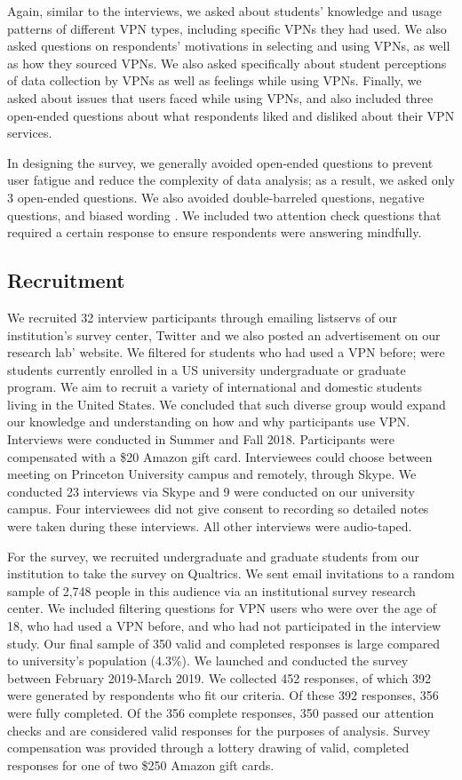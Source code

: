 Again, similar to the interviews, we asked about students’
knowledge and usage patterns of different VPN types, including specific VPNs
they had used. We also asked questions on respondents’ motivations in
selecting and using VPNs, as well as how they sourced VPNs. We also asked specifically 
about student perceptions of data collection by VPNs as well as feelings while
using VPNs. Finally, we asked about issues that
users faced while using VPNs, and also included three open-ended questions about
what respondents liked and disliked about their VPN services.

In designing the survey, we generally avoided open-ended questions to prevent
user fatigue and reduce the complexity of data analysis; as a result, we asked
only 3 open-ended questions. We also avoided double-barreled questions,
negative questions, and biased wording \cite{lazar_28}. We included two attention check
questions that required a certain response to ensure respondents were answering mindfully. 

\subsection{Recruitment} We recruited 32 interview participants through
emailing listservs of our institution's survey center, Twitter and we also
posted an advertisement on  our research lab' website. We filtered for students who had used a VPN before; were students currently enrolled in a US university undergraduate or graduate program.  We aim to recruit a variety of international and domestic students living in the United States.
We concluded that such diverse group would expand our knowledge and
understanding on how and why participants use VPN. Interviews were conducted in Summer and Fall 2018. Participants were compensated with a \$20 Amazon gift card.  Interviewees
could choose between meeting on Princeton University campus and remotely,
through Skype. We conducted 23 interviews via Skype and 9 were conducted on our university campus.  Four interviewees did not give consent to
recording so detailed notes were taken during these interviews. All other interviews were audio-taped.

For the survey, we recruited undergraduate and
graduate students from our institution to take the survey on Qualtrics. We sent email invitations to a random sample of 2,748 people in this
audience via an institutional survey research center. We included filtering questions for VPN users who were
over the age of 18, who had used a VPN before, and who had not participated in the interview study. Our
final sample of 350 valid and completed responses is large compared to
university's population (4.3\%). We launched and conducted the survey between February 2019-March 2019. We collected 452 responses, of which 392 were generated by
respondents who fit our criteria. Of these 392 responses, 356 were fully
completed. Of the 356 complete responses, 350 passed our attention checks and
are considered valid responses for the purposes of analysis. Survey compensation was provided through a lottery drawing of valid, completed
responses for one of two \$250 Amazon gift cards.

